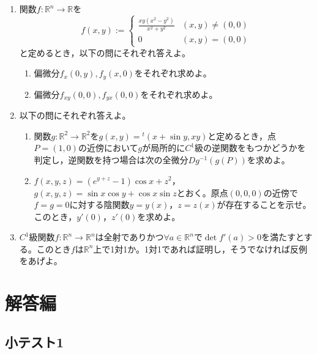 \documentclass[dvipdfmx,a4j,10pt]{jsarticle}
\theoremstyle{mystyle1}
\theoremstyle{mystyle2}
\begin{document}
\begin{enumerate}
    \item 関数$f:\mathbb{R}^n\to\mathbb{R}$を
        \[
        f(x,y):=
        \begin{cases}
            \displaystyle\frac{xy(x^2-y^2)}{x^2+y^2} & (x,y)\neq(0,0) \\
            0 & (x,y)=(0,0)
        \end{cases}
        \]
        と定めるとき，以下の問にそれぞれ答えよ。
        \begin{enumerate}\renewcommand{\labelenumii}{(\arabic{enumii})}
            \item 偏微分$f_x(0,y),f_y(x,0)$をそれぞれ求めよ。
            \item 偏微分$f_{xy}(0,0),f_{yx}(0,0)$をそれぞれ求めよ。
        \end{enumerate}
    \item 以下の問にそれぞれ答えよ。
        \begin{enumerate}\renewcommand{\labelenumii}{(\arabic{enumii})}
            \item 関数$g:\mathbb{R}^2\to\mathbb{R}^2$を$g(x,y)={}^t(x+\sin y,xy)$と定めるとき，点$P=(1,0)$の近傍において$g$が局所的に$C^1$級の逆関数をもつかどうかを判定し，逆関数を持つ場合は次の全微分$Dg^{-1}(g(P))$を求めよ。
            \item $f(x,y,z)=(e^{y+z}-1)\cos x+z^2$，$g(x,y,z)=\sin x\cos y+\cos x\sin z$とおく。原点$(0,0,0)$の近傍で$f=g=0$に対する陰関数$y=y(x)$，$z=z(x)$が存在することを示せ。このとき，$y'(0)$，$z'(0)$を求めよ。
        \end{enumerate}
    \item $C^1$級関数$f:\mathbb{R}^n\to\mathbb{R}^n$は全射でありかつ$\forall a\in\mathbb{R}^n$で$\det f'(a)>0$を満たすとする。このとき$f$は$\mathbb{R}^n$上で1対1か。1対1であれば証明し，そうでなければ反例をあげよ。
\end{enumerate}

\newpage

\section{解答編}

\subsection{小テスト1}
\end{document}
